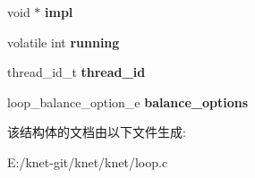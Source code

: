 \begin{DoxyCompactItemize}
\item 
\hypertarget{struct__loop__t_a7fccdd254b563ddcfc44ae772dfe1d21}{}void $\ast$ {\bfseries impl}\label{struct__loop__t_a7fccdd254b563ddcfc44ae772dfe1d21}

\item 
\hypertarget{struct__loop__t_abfb04cce945320081c75c19b6898a7cf}{}volatile int {\bfseries running}\label{struct__loop__t_abfb04cce945320081c75c19b6898a7cf}

\item 
\hypertarget{struct__loop__t_aa52cbdff546a9e2868d2b3397e68d6dd}{}thread\+\_\+id\+\_\+t {\bfseries thread\+\_\+id}\label{struct__loop__t_aa52cbdff546a9e2868d2b3397e68d6dd}

\item 
\hypertarget{struct__loop__t_a90fefc1ea1db1db789b46c689a31adbc}{}loop\+\_\+balance\+\_\+option\+\_\+e {\bfseries balance\+\_\+options}\label{struct__loop__t_a90fefc1ea1db1db789b46c689a31adbc}

\end{DoxyCompactItemize}


该结构体的文档由以下文件生成\+:\begin{DoxyCompactItemize}
\item 
E\+:/knet-\/git/knet/knet/loop.\+c\end{DoxyCompactItemize}
